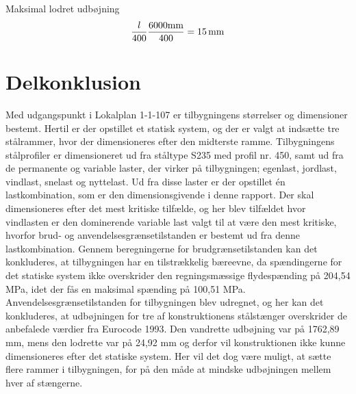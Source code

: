 Maksimal lodret udbøjning
\begin{equation}
\frac{l}{400}
\\
\frac{6000 \text{mm}}{400} = \SI{15}{mm}
\end{equation}

\section{Delkonklusion}
Med udgangspunkt i Lokalplan 1-1-107 er tilbygningens størrelser og dimensioner bestemt. Hertil er der opstillet et statisk system, og der er valgt at indsætte tre stålrammer, hvor der  dimensioneres efter den midterste ramme.
\newline \indent{     }  Tilbygningens stålprofiler er dimensioneret ud fra ståltype S235 med profil nr. 450, samt ud fra de permanente og variable laster, der virker på tilbygningen; egenlast, jordlast, vindlast, snelast og nyttelast. Ud fra disse laster er der opstillet én lastkombination, som er den dimensionsgivende i denne rapport. Der skal dimensioneres efter det mest kritiske tilfælde, og her blev tilfældet hvor vindlasten er den dominerende variable last valgt til at være den mest kritiske, hvorfor brud- og anvendelsesgrænsetilstanden er bestemt ud fra denne lastkombination. 
\newline \indent{     }  Gennem beregningerne for brudgrænsetilstanden kan det konkluderes, at tilbygningen har en tilstrækkelig bæreevne, da spændingerne for det statiske system ikke overskrider den regningsmæssige flydespænding på 204,54 MPa, idet der fås en maksimal spænding på 100,51 MPa.
\newline \indent{     }  Anvendelsesgrænsetilstanden for tilbygningen blev udregnet, og her kan det konkluderes, at udbøjningen for tre af konstruktionens stålstænger overskrider de anbefalede værdier fra Eurocode 1993. Den vandrette udbøjning var på 1762,89 mm, mens den lodrette var på 24,92 mm og derfor vil konstruktionen ikke kunne dimensioneres efter det statiske system. Her vil det dog være muligt, at sætte flere rammer i tilbygningen, for på den måde at mindske udbøjningen mellem hver af stængerne.